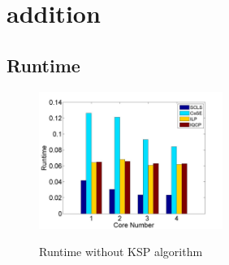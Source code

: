\section{addition}






\subsection{Runtime}

\begin{figure}
\centering
\includegraphics[width=2.35in]{franz/Runtime_NoKSP}\\
\caption{Runtime without KSP algorithm}\label{fig:Runtime_NoKSP}
\end{figure}

